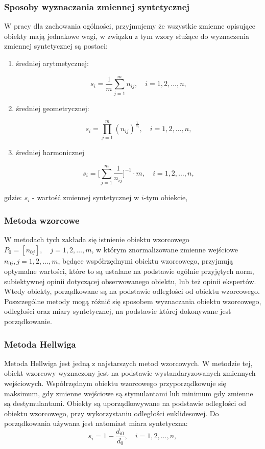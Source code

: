 \documentclass[12pt,a4paper]{report}
\begin{document}
\subsubsection{Sposoby wyznaczania zmiennej syntetycznej}
W pracy dla zachowania ogólności, przyjmujemy że wszystkie zmienne opisujące obiekty mają jednakowe wagi, w związku z tym wzory służące do wyznaczenia zmiennej syntetycznej są postaci:
\begin{enumerate}
\item średniej arytmetycznej:

$$
s_{i}=\frac{1}{m} \sum_{j=1}^{m} n_{ij},  \quad i=1, 2, \ldots, n,
$$

\item średniej geometrycznej:

$$
s_{i}=\prod_{j=1}^{m} (n_{ij})^{\frac{1}{m}}, \quad i=1, 2, \ldots, n,
$$

\item średniej harmonicznej

$$
s_{i}=\big[\sum_{j=1}^{m} \frac{1}{n_{ij}}\big]^{-1} \cdot m, \quad i=1, 2, \ldots, n,
$$

\end{enumerate}
gdzie:
$s_{i}$ - wartość zmiennej syntetycznej w $i$-tym obiekcie,

\subsubsection{Metoda wzorcowe}


W metodach tych zakłada się istnienie obiektu wzorcowego $P_{0}=[n_{0j}], \quad  j= 1,2,\ldots,m$, w którym znormalizowane zmienne wejściowe $n_{0j},  j= 1,2,\ldots,m$, będące współrzędnymi obiektu wzorcowego, przyjmują optymalne wartości, które to są ustalane na podstawie ogólnie przyjętych norm, subiektywnej opinii dotyczącej obserwowanego obiektu, lub też opinii ekspertów. Wtedy obiekty, porządkowane są na podstawie odległości od obiektu wzorcowego. 
Poszczególne metody mogą różnić się sposobem wyznaczania obiektu wzorcowego, odległości oraz miary syntetycznej, na podstawie której dokonywane jest porządkowanie.

\subsubsection{Metoda Hellwiga}


Metoda Hellwiga jest jedną z najstarszych metod wzorcowych. W metodzie tej, obiekt wzorcowy wyznaczony jest na podstawie wystandaryzowanych zmiennych wejściowych. Współrzędnym obiektu wzorcowego przyporządkowuje się maksimum, gdy zmienne wejściowe są stymulantami lub minimum gdy zmienne są destymulantami. Obiekty są uporządkowywane na podstawie odległości od obiektu wzorcowego, przy wykorzystaniu odległości euklidesowej.
Do porządkowania używana jest natomiast miara syntetyczna: 
$$
s_i=1-\frac{d_{i0}}{d_{0}},\quad i=1, 2, \ldots, n ,
$$
\end{document}

